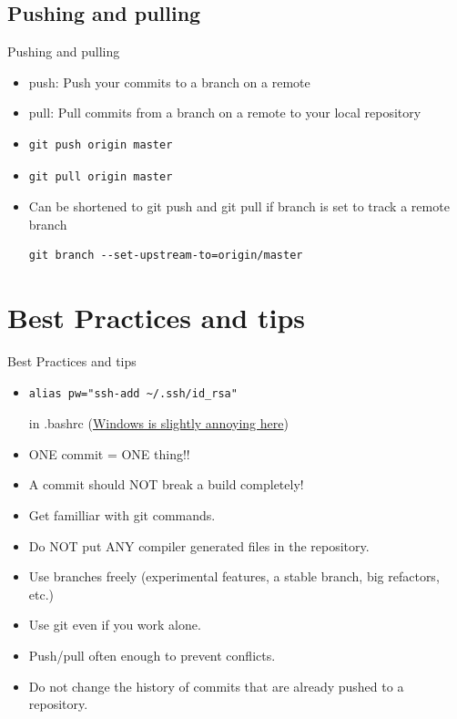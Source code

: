 \documentclass[10pt,a4paper]{beamer}
\begin{document}
\subsection{Pushing and pulling}
\begin{frame}[fragile]{Pushing and pulling}
\begin{itemize}
\item push: Push your commits to a branch on a remote
\item pull: Pull commits from a branch on a remote to your local repository
\item \begin{verbatim}git push origin master\end{verbatim}
\item \begin{verbatim}git pull origin master\end{verbatim}
\item Can be shortened to git push and git pull if branch is set to track a remote branch
\begin{verbatim}git branch --set-upstream-to=origin/master\end{verbatim}
\end{itemize}
\end{frame}


\section{Best Practices and tips}
\begin{frame}[fragile]{Best Practices and tips}
\pause
\begin{itemize}
\item \begin{verbatim}alias pw="ssh-add ~/.ssh/id_rsa"\end{verbatim} 
in .bashrc (\href{http://stackoverflow.com/questions/3669001/getting-ssh-agent-to-work-with-git-run-from-windows-command-shell/15870387#15870387}{\color{blue}Windows is slightly annoying here})
\pause
\item ONE commit = ONE thing!!
\pause
\item A commit should NOT break a build completely!
\pause
\item Get familliar with git commands.
\pause
\item Do NOT put ANY compiler generated files in the repository.
\pause
\item Use branches freely (experimental features, a stable branch, big refactors, etc.)
\pause
\item Use git even if you work alone.
\pause
\item Push/pull often enough to prevent conflicts.
\pause
\item Do not change the history of commits that are already pushed to a repository.
\end{itemize}
\end{frame}
\end{document}
